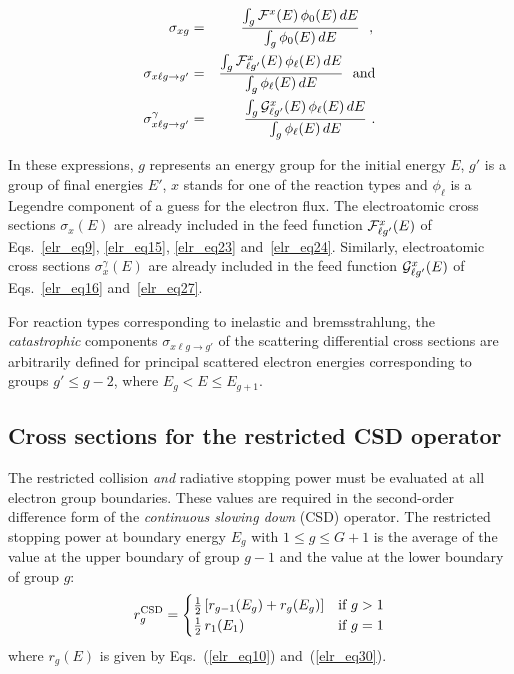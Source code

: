   \begin{eqnarray}
    \sigma_{xg}&=&{{\int_g{\cal F}^x(E)\,\phi_0(E)\,dE}
    \over {\int_g\phi_0(E)\,dE}} \ \ ,
    \mbox{}\\
    \sigma_{x\ell g\rightarrow g'}&=&
    {{\int_g{\cal F}^x_{\ell g'}(E)\,\phi_\ell(E)\,dE}
    \over {\int_g\phi_\ell(E)\,dE}} \ \ \hbox{and}\\
    \sigma_{x\ell g\rightarrow g'}^\gamma&=&
    {{\int_g{\cal G}^x_{\ell g'}(E)\,\phi_\ell(E)\,dE}
    \over {\int_g\phi_\ell(E)\,dE}} \,\,.
  \label{elr_eq29}
  \end{eqnarray}

\noindent
In these expressions, $g$ represents an energy group for the initial
energy $E$, $g'$ is a group of final energies $E'$, $x$ stands for one
of the reaction types and $\phi_\ell$ is a Legendre component of a
guess for the electron flux. The electroatomic cross sections
$\sigma_x(E)$ are already included in the feed function
${\cal F}^x_{\ell g'}(E)$ of Eqs.~\ref{elr_eq9}, \ref{elr_eq15},
\ref{elr_eq23} and~\ref{elr_eq24}. Similarly, electroatomic cross sections
$\sigma_x^\gamma(E)$ are already included in the feed function
${\cal G}^x_{\ell g'}(E)$ of Eqs.~\ref{elr_eq16} and~\ref{elr_eq27}.

For reaction types corresponding to inelastic and bremsstrahlung, the
{\sl catastrophic} components $\sigma_{x\ell g\rightarrow g'}$ of the
scattering differential cross sections are arbitrarily defined for principal
scattered electron energies corresponding to groups $g'\le g-2$, where
$E_g < E\le E_{g+1}$.

\subsection{Cross sections for the restricted CSD operator}
\label{ssELECTR_CSDOperator}

The restricted collision {\sl and} radiative stopping power must be
evaluated at all electron group boundaries. These values are required
in the second-order difference form of the {\sl continuous slowing
down} (CSD) operator. The restricted stopping power at boundary energy
$E_g$ with $1 \le g \le G+1$ is the average of the value at the
upper boundary of group $g-1$ and the value at the lower boundary of
group $g$:
  \begin{equation}
    r_g^{\rm CSD} = \begin{cases}
    {1\over 2}\left[ r_{g-1}(E_g)+ r_g(E_g)\right] & \text{if $g>1$} \\
    {1\over 2}\, r_{1}(E_1) & \text{if $g=1$} \end{cases}
  \label{elr_eq30}
  \end{equation}
\noindent where $r_g(E)$ is given by Eqs.~(\ref{elr_eq10})
and~(\ref{elr_eq30}).


